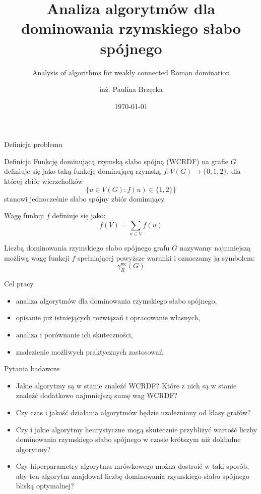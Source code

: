 \documentclass[polish,aspectratio=169]{beamer}
\title[Analiza algorytmów dla dominowania rzymskiego słabo spójnego]{Analiza algorytmów dla dominowania rzymskiego słabo spójnego}
\subtitle{Analysis of algorithms for weakly connected Roman domination}
\author{inż. Paulina Brzęcka}
\date{\today}
\begin{document}
\pgtitleframe

\begin{frame}{Definicja problemu}
    \begin{block}{Definicja}
        Funkcję dominującą rzymską słabo spójną (WCRDF) na grafie \( G \) definiuje się jako taką funkcję dominującą rzymską \( f \colon V(G) \to \{0, 1, 2\} \), dla której zbiór wierzchołków
        \[
        \{ u \in V(G) : f(u) \in \{1, 2\} \}
        \]
        stanowi jednocześnie słabo spójny zbiór dominujący.
        
        \vspace{1em}

        Wagę funkcji \( f \) definiuje się jako:
        \[
        f(V) = \sum_{u \in V} f(u)
        \]

        Liczbą dominowania rzymskiego słabo spójnego grafu \( G \) nazywamy najmniejszą możliwą wagę funkcji \( f \) spełniającej powyższe warunki i oznaczamy ją symbolem:
        \[
        \gamma^{\mathrm{wc}}_R(G)
        \]
    \end{block}
\end{frame}

\begin{frame}{Cel pracy}
    \begin{itemize}
        \item analiza algorytmów dla dominowania rzymskiego słabo spójnego,
        \item opisanie już istniejących rozwiązań i opracowanie własnych,
        \item analiza i porównanie ich skuteczności,
        \item znalezienie możliwych praktycznych zastosowań.
    \end{itemize}
\end{frame}

\begin{frame}{Pytania badawcze}
    \begin{itemize}
        \item Jakie algorytmy są w stanie znaleźć WCRDF? Które z nich są w stanie znaleźć dodatkowo najmniejszą sumę wag WCRDF?
        \item Czy czas i jakość działania algorytmów będzie uzależniony od klasy grafów?
        \item Czy i jakie algorytmy heurystyczne mogą skutecznie przybliżyć wartość liczby dominowania rzymskiego słabo spójnego w czasie krótszym niż dokładne algorytmy?
        \item Czy hiperparametry algorytmu mrówkowego można dostroić w taki sposób, aby ten algorytm znajdował liczbę dominowania rzymskiego słabo spójnego bliską optymalnej?
    \end{itemize}
\end{frame}
\end{document}
